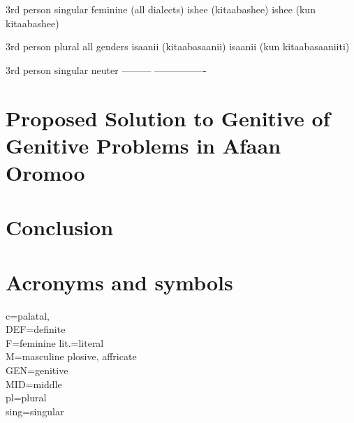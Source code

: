 \documentclass[11pt,a4paper]{article}
\begin{document}
	3rd person singular
	feminine
	(all dialects)             ishee (kitaabashee)                       ishee (kun kitaabashee)
	
	3rd person plural
	all genders               isaanii (kitaabasaanii)                    isaanii (kun kitaabasaaniiti)
	
	3rd person singular
	neuter                    ---------                                 ----------------
	
	\section{Proposed Solution to Genitive of Genitive Problems in Afaan Oromoo}
	
	
	\section{Conclusion}
	
	\newpage
	
	
	
	\newpage
	\section*{Acronyms and symbols}
	c=palatal,\\
	DEF=definite\\
	F=feminine
	lit.=literal\\
	M=masculine
	plosive, affricate\\
	GEN=genitive\\
	MID=middle\\
	pl=plural\\
	sing=singular\\
	
\end{document}
